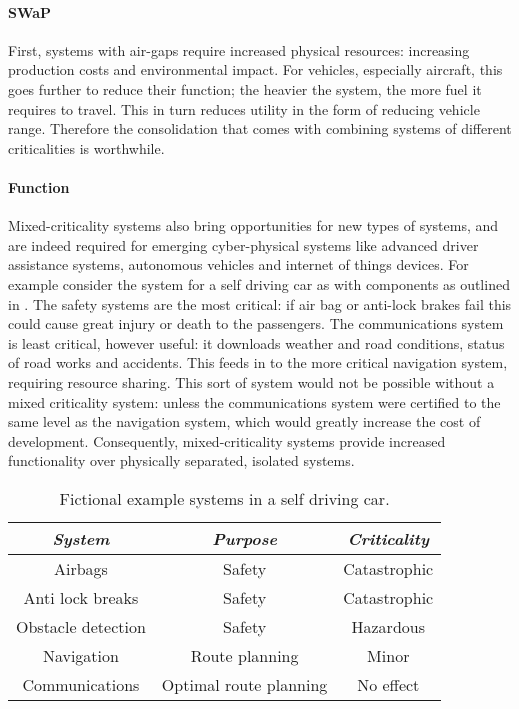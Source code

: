 \paragraph{SWaP} First, systems with air-gaps require increased physical
resources: increasing production costs and environmental impact.
For vehicles, especially aircraft, this goes further to reduce their function; the
heavier the system,  the more fuel it requires to travel. This in turn reduces
utility in the form of reducing vehicle range. Therefore the consolidation that comes
with combining systems of different criticalities is worthwhile.  

\paragraph{Function} 
Mixed-criticality systems also bring opportunities for new types of
systems, and are indeed required for emerging cyber-physical systems like
advanced driver assistance systems, autonomous vehicles and internet of things devices.
For example consider the system for a self driving
car as with components as outlined in .  The safety
systems are the most critical: if air bag or anti-lock brakes fail this could
cause great injury or death to the passengers.  The communications system is
least critical, however useful: it downloads weather and road conditions,
status of road works and accidents.  This feeds in to the more critical
navigation system, requiring resource sharing.  This sort of system would not
be possible without a mixed criticality system: unless the communications
system were certified to the same level as the navigation system, which would
greatly increase the cost of development.  Consequently, mixed-criticality
systems provide increased functionality over physically separated, isolated
systems.

\begin{table} 
\centering
\begin{tabular}{ccc}\toprule
    \emph{System}     & \emph{Purpose} & \emph{Criticality} \\\midrule
     Airbags            & Safety &  Catastrophic \\
     Anti lock breaks   & Safety &  Catastrophic \\
     Obstacle detection & Safety &  Hazardous    \\
     Navigation         & Route planning & Minor \\  
     Communications     & Optimal route planning & No effect \\
    \bottomrule
\end{tabular}
\caption{Fictional example systems in a self driving car.}
\label{tab:self-driving-car}
\end{table}

